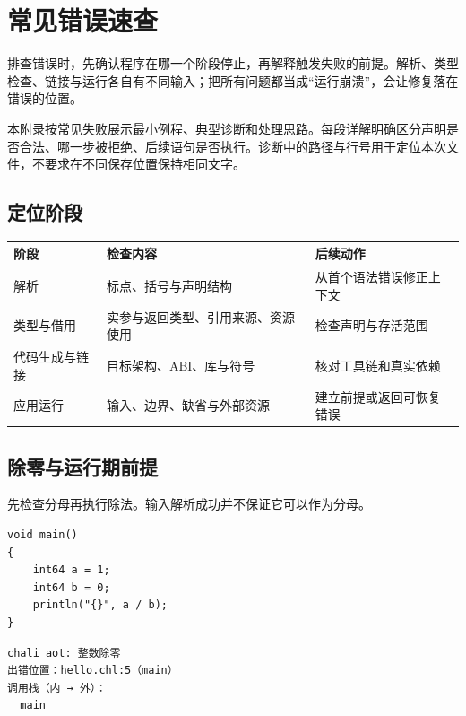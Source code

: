\chapter{常见错误速查}
\label{ch:appA}

排查错误时，先确认程序在哪一个阶段停止，再解释触发失败的前提。解析、类型检查、链接与运行各自有不同输入；把所有问题都当成“运行崩溃”，会让修复落在错误的位置。

本附录按常见失败展示最小例程、典型诊断和处理思路。每段详解明确区分声明是否合法、哪一步被拒绝、后续语句是否执行。诊断中的路径与行号用于定位本次文件，不要求在不同保存位置保持相同文字。

\section{定位阶段}

\begin{center}
\begin{tabular}{lll}
\toprule
阶段 & 检查内容 & 后续动作 \\
\midrule
解析 & 标点、括号与声明结构 & 从首个语法错误修正上下文 \\
类型与借用 & 实参与返回类型、引用来源、资源使用 & 检查声明与存活范围 \\
代码生成与链接 & 目标架构、ABI、库与符号 & 核对工具链和真实依赖 \\
应用运行 & 输入、边界、缺省与外部资源 & 建立前提或返回可恢复错误 \\
\bottomrule
\end{tabular}
\end{center}

\section{除零与运行期前提}

先检查分母再执行除法。输入解析成功并不保证它可以作为分母。

\par
\medskip
\begin{lstlisting}[style=chali]
void main()
{
    int64 a = 1;
    int64 b = 0;
    println("{}", a / b);
}
\end{lstlisting}
\par
\medskip

\par
\medskip
\begin{lstlisting}[style=out]
chali aot: 整数除零
出错位置：hello.chl:5（main）
调用栈（内 → 外）：
  main
\end{lstlisting}
\par
\medskip

